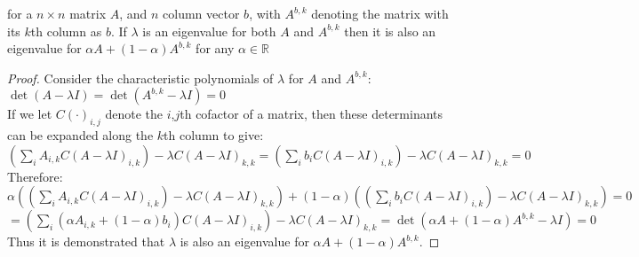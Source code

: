 \pagebreak





\begin{Lemma}\label{lem2}
for a $n\times n$ matrix $A$, and $n$ column vector $b$, with $A^{b,k}$ denoting the matrix with its $k$th column as $b$.
If $\lambda$ is an eigenvalue for both $A$ and $A^{b,k}$ then it is also an eigenvalue for $\alpha A + (1-\alpha)A^{b,k}$ for any $\alpha \in \mathbb{R}$
\end{Lemma}
\begin{proof}
Consider the characteristic polynomials of $\lambda$ for $A$ and $A^{b,k}$:\\
$\det(A-\lambda I)=\det(A^{b,k}-\lambda I)=0$\\
If we let $C(\cdot)_{i,j}$ denote the $i$,$j$th cofactor of a matrix, then these determinants can be expanded along the $k$th column to give:\\
$\left(\sum_iA_{i,k}C(A-\lambda I)_{i,k}\right)-\lambda C(A-\lambda I)_{k,k}=\left(\sum_ib_iC(A-\lambda I)_{i,k}\right)-\lambda C(A-\lambda I)_{k,k}=0$\\
Therefore:\\
$\alpha\left(\left(\sum_iA_{i,k}C(A-\lambda I)_{i,k}\right)-\lambda C(A-\lambda I)_{k,k}\right) + (1-\alpha)\left(\left(\sum_ib_iC(A-\lambda I)_{i,k}\right)-\lambda C(A-\lambda I)_{k,k}\right)=0$\\
$=\left(\sum_i(\alpha A_{i,k}+(1-\alpha)b_i)C(A-\lambda I)_{i,k}\right)-\lambda C(A-\lambda I)_{k,k} =\det(\alpha A + (1-\alpha)A^{b,k}-\lambda I)=0$\\
Thus it is demonstrated that $\lambda$ is also an eigenvalue for $\alpha A + (1-\alpha)A^{b,k}$.
\end{proof}

